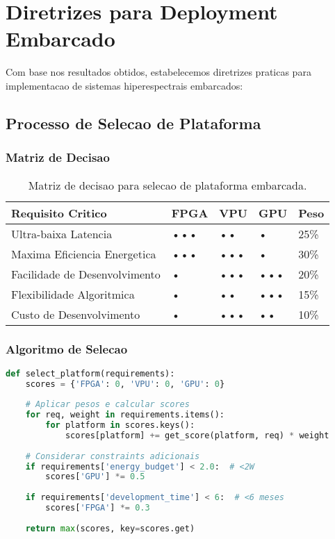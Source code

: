\section{Diretrizes para Deployment Embarcado}\label{sec:diretrizes_deployment}

Com base nos resultados obtidos, estabelecemos diretrizes praticas para implementacao de sistemas hiperespectrais embarcados:

\subsection{Processo de Selecao de Plataforma}

\subsubsection{Matriz de Decisao}
\begin{table}[!htp]
\caption[Matriz de Selecao de Plataforma]{Matriz de decisao para selecao de plataforma embarcada.}
\label{tab:matriz_selecao}
\begin{center}
\begin{tabular}{|p{3cm}|p{2cm}|p{2cm}|p{2cm}|p{2cm}|}
\hline
\textbf{Requisito Critico} & \textbf{FPGA} & \textbf{VPU} & \textbf{GPU} & \textbf{Peso} \\
\hline
Ultra-baixa Latencia & ••• & •• & • & 25\% \\
\hline
Maxima Eficiencia Energetica & ••• & ••• & • & 30\% \\
\hline
Facilidade de Desenvolvimento & • & ••• & ••• & 20\% \\
\hline
Flexibilidade Algoritmica & • & •• & ••• & 15\% \\
\hline
Custo de Desenvolvimento & • & ••• & •• & 10\% \\
\hline
\end{tabular}
\end{center}
\end{table}

\subsubsection{Algoritmo de Selecao}
\begin{lstlisting}[language=Python]
def select_platform(requirements):
    scores = {'FPGA': 0, 'VPU': 0, 'GPU': 0}
    
    # Aplicar pesos e calcular scores
    for req, weight in requirements.items():
        for platform in scores.keys():
            scores[platform] += get_score(platform, req) * weight
    
    # Considerar constraints adicionais
    if requirements['energy_budget'] < 2.0:  # <2W
        scores['GPU'] *= 0.5
    
    if requirements['development_time'] < 6:  # <6 meses
        scores['FPGA'] *= 0.3
    
    return max(scores, key=scores.get)
\end{lstlisting}

